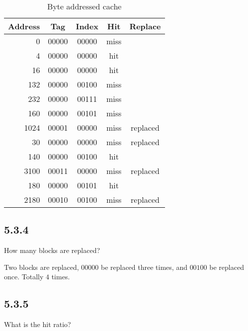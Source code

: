 \documentclass[paper=a4, fontsize=11pt]{scrartcl} %
\begin{document}
\begin{table}[H]
    \caption{Byte addressed cache}\label{tab:byte_cache}
    \begin{center}
        \begin{tabular}{rcccc}
        \toprule
        \textbf{Address} & \textbf{Tag} & \textbf{Index} & \textbf{Hit} & \textbf{Replace} \\
        \midrule
           0 & 00000 & 00000 & miss & \\
           4 & 00000 & 00000 & hit  & \\
          16 & 00000 & 00000 & hit  & \\
         132 & 00000 & 00100 & miss & \\
         232 & 00000 & 00111 & miss & \\
         160 & 00000 & 00101 & miss & \\
        1024 & 00001 & 00000 & miss & replaced \\
          30 & 00000 & 00000 & miss & replaced \\
         140 & 00000 & 00100 & hit  & \\
        3100 & 00011 & 00000 & miss & replaced \\
         180 & 00000 & 00101 & hit  & \\
        2180 & 00010 & 00100 & miss & replaced \\
        \bottomrule
        \end{tabular}
    \end{center}
\end{table}


\subsection{5.3.4} %
\label{sub:5_3_4}
\begin{fancyquotes}
    How many blocks are replaced?
\end{fancyquotes}

Two blocks are replaced, $00000$ be replaced three times, and $00100$ be replaced once.
Totally $4$ times.


\subsection{5.3.5} %
\label{sub:5_3_5}
\begin{fancyquotes}
    What is the hit ratio?
\end{fancyquotes}
\end{document}
